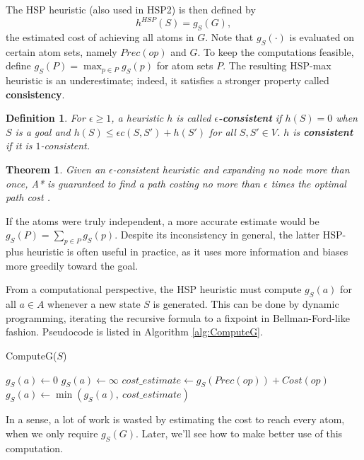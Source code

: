 \documentclass[letterpaper]{article}
\newtheorem{thm}{Theorem}
\newtheorem{defn}{Definition}
\begin{document}
The HSP heuristic (also used in HSP2) is then defined by
\[h^{HSP}(S) = g_S(G),\]
the estimated cost of achieving all atoms in $G$. Note that $g_S(\cdot)$ is evaluated on certain atom sets, namely $Prec(op)$ and $G$.
To keep the computations feasible, define $g_S(P) = \max_{p\in P} g_S(p)$ for atom sets $P$.
The resulting HSP-max heuristic is an underestimate; indeed, it satisfies a stronger property called \textbf{consistency}.

\begin{defn} For $\epsilon\ge 1$, a heuristic $h$ is called \textbf{$\epsilon$-consistent} if $h(S) = 0$ when $S$ is a goal and $h(S) \le \epsilon c(S,S') + h(S')$ for all $S,S'\in V$. $h$ is \textbf{consistent} if it is $1$-consistent. \end{defn}
\begin{thm} Given an $\epsilon$-consistent heuristic and expanding no node more than once, A* is guaranteed to find a path costing no more than $\epsilon$ times the optimal path cost \cite{LikGorThr-ara}. \end{thm}

If the atoms were truly independent, a more accurate estimate would be $g_S(P) = \sum_{p\in P} g_S(p)$.
Despite its inconsistency in general, the latter HSP-plus heuristic is often useful in practice, as it uses more information and biases more greedily toward the goal.

From a computational perspective, the HSP heuristic must compute $g_S(a)$ for all $a\in A$ whenever a new state $S$ is generated.
This can be done by dynamic programming, iterating the recursive formula to a fixpoint in Bellman-Ford-like fashion.
Pseudocode is listed in Algorithm \ref{alg:ComputeG}.

\begin{algorithm}
\caption{ComputeG($S$)}
\label{alg:ComputeG}
\begin{algorithmic}
\STATE $g_S(a) \leftarrow 0$
\ELSE
\STATE $g_S(a) \leftarrow \infty$
\ENDIF
\ENDFOR
\REPEAT
{}
\STATE $cost\_estimate \leftarrow g_S(Prec(op)) + Cost(op)$
\STATE $g_S(a) \leftarrow \min \left(g_S(a),~cost\_estimate\right)$
\ENDFOR
\ENDFOR
{}
\end{algorithmic}
\end{algorithm}

In a sense, a lot of work is wasted by estimating the cost to reach every atom, when we only require $g_S(G)$.
Later, we'll see how to make better use of this computation.
\end{document}
